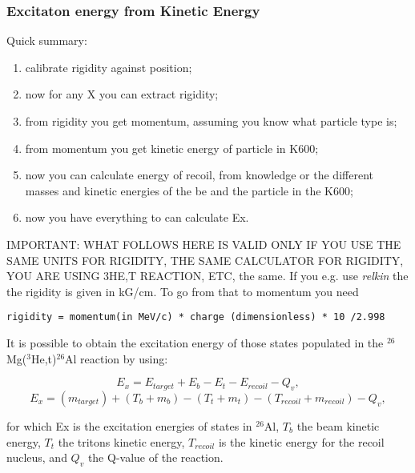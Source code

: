 \documentclass[11pt]{report}
\begin{document}
\subsubsection{Excitaton energy from Kinetic Energy}

Quick summary:
\begin{enumerate}
\item calibrate rigidity against position;
\item now for any X you can extract rigidity;
\item from rigidity you get momentum, assuming you know what particle type is;
\item from momentum you get kinetic energy of particle in K600;
\item now you can calculate energy of recoil, from knowledge or the different masses and
kinetic energies of the be and the particle in the K600;
\item now you have everything to can calculate Ex.
\end{enumerate}
{\color{red} IMPORTANT: WHAT FOLLOWS HERE IS VALID ONLY IF YOU USE THE SAME UNITS
FOR RIGIDITY, THE SAME CALCULATOR FOR RIGIDITY, YOU ARE USING 3HE,T REACTION, ETC, the same.  If you e.g. use {\it relkin}
the the rigidity is given in kG/cm. To go from that to momentum you need
\begin{verbatim}
rigidity = momentum(in MeV/c) * charge (dimensionless) * 10 /2.998
\end{verbatim}
}





It is possible to obtain the excitation energy of those states populated in the $^{26}$Mg($^{3}$He,t)$^{26}$Al reaction by using:  

\begin{equation}
E_x=E_{target}+E_{b}-E_{t}- E_{recoil}-Q_{v},
\end{equation}
\begin{equation}
E_x=(m_{target}) + (T_{b}+m_{b}) - (T_{t}+m_{t}) - (T_{recoil}+m_{recoil}) - Q_{v},
\end{equation}

\noindent
for which Ex is the excitation energies of states in $^{26}$Al, $T_{b}$ the beam kinetic energy, $T_{t}$ the tritons kinetic energy, 
$T_{recoil}$ is the kinetic energy for the recoil nucleus,  and $Q_{v}$ the Q-value of the reaction.\\
\end{document}
